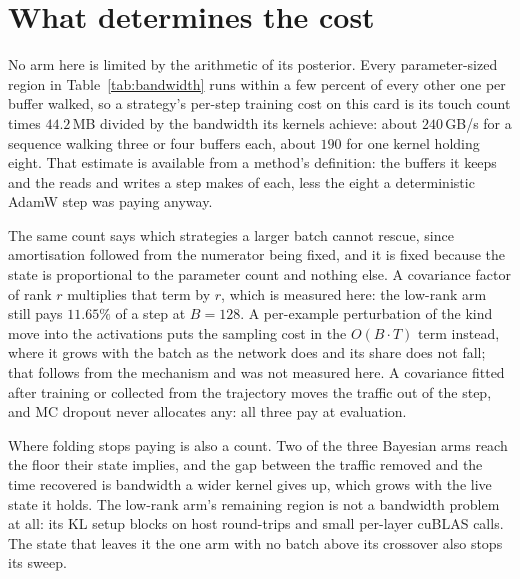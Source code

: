\section{What determines the cost}
\label{sec:discussion}


No arm here is limited by the arithmetic of its posterior. Every parameter-sized
region in Table~\ref{tab:bandwidth} runs within a few percent of every other one per
buffer walked, so a strategy's per-step training cost on this card is its touch count
times $44.2$\,MB divided by the bandwidth its kernels achieve: about $240$\,GB/s for
a sequence walking three or four buffers each, about $190$ for one kernel holding
eight. That estimate is available from a method's definition: the buffers it
keeps and the reads and writes a step makes of each, less the eight a deterministic
AdamW step was paying anyway.

The same count says which strategies a larger batch cannot rescue, since amortisation
followed from the numerator being fixed, and it is fixed because the state is
proportional to the parameter count and nothing else. A covariance factor of rank $r$
multiplies that term by $r$, which is measured here: the low-rank arm still pays
$11.65\%$ of a step at $B = 128$. A per-example perturbation of the kind
\citet{wen2018flipout} move into the activations puts the sampling cost in the $O(B
\cdot T)$ term instead, where it grows with the batch as the network does and its share
does not fall; that follows from the mechanism and was not measured here. A covariance
fitted after training \citep{ritter2018scalable,daxberger2021laplace} or collected from
the trajectory \citep{maddox2019swag} moves the traffic out of the step, and MC dropout
\citep{gal2016dropout} never allocates any: all three pay at evaluation.

Where folding stops paying is also a count. Two of the three Bayesian arms reach the
floor their state implies, and the gap between the traffic removed and the time
recovered is bandwidth a wider kernel gives up, which grows with the live state it
holds. The low-rank arm's remaining region is not a bandwidth problem at all: its KL
setup blocks on host round-trips and small per-layer cuBLAS calls. The state that
leaves it the one arm with no batch above its crossover also stops its sweep.
